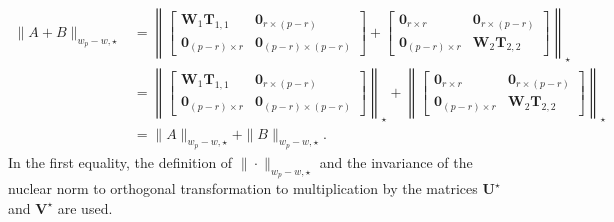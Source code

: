 \documentclass[alpha-refs]{wiley-article}
\begin{document}
\begin{align*}
    \|A+B\|_{w_{p} - w, \star}
    &= \left\| \begin{bmatrix}
        \boldsymbol{W}_{1}\boldsymbol{T}_{1,1} & \boldsymbol{0}_{r\times (p-r)} \\
        \boldsymbol{0}_{(p-r) \times r} & \boldsymbol{0}_{(p-r) \times (p-r)}
    \end{bmatrix} +
    \begin{bmatrix}
        \boldsymbol{0}_{r \times r} & \boldsymbol{0}_{r\times (p-r)} \\
        \boldsymbol{0}_{(p-r) \times r} & \boldsymbol{W}_{2}\boldsymbol{T}_{2,2}
    \end{bmatrix}
    \right\|_{\star}\\
    &= \left\| \begin{bmatrix}
        \boldsymbol{W}_{1}\boldsymbol{T}_{1,1} & \boldsymbol{0}_{r\times (p-r)} \\
        \boldsymbol{0}_{(p-r) \times r} & \boldsymbol{0}_{(p-r) \times (p-r)}
    \end{bmatrix}  \right\|_{\star}
    + \left\|\begin{bmatrix}
        \boldsymbol{0}_{r \times r} & \boldsymbol{0}_{r\times (p-r)} \\
        \boldsymbol{0}_{(p-r) \times r} & \boldsymbol{W}_{2}\boldsymbol{T}_{2,2}
    \end{bmatrix}\right\|_{\star} \\
    &= \|A\|_{w_{p} - w, \star}+\|B\|_{w_{p} - w, \star}.
\end{align*}
In the first equality, the definition of $\|\cdot\|_{w_{p} - w, \star}$ and the invariance of the nuclear norm to orthogonal transformation to multiplication by the matrices $\boldsymbol{U}^{\star}$ and $\boldsymbol{V}^{\star}$ are used.
\end{document}

